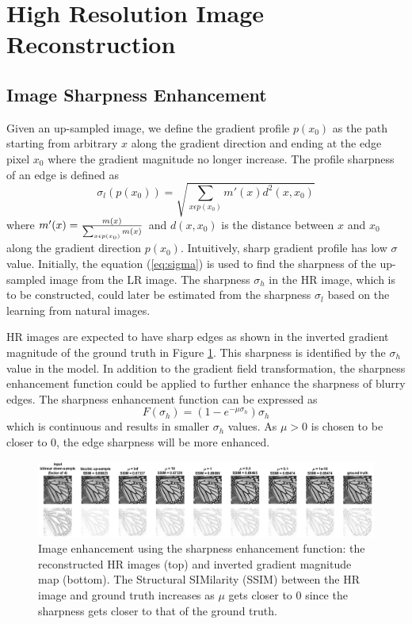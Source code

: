 \documentclass[a4paper,11pt]{article}
\begin{document}
\section{High Resolution Image Reconstruction}

\subsection{Image Sharpness Enhancement}

Given an up-sampled image, we define the gradient profile $p(x_0)$ as the path starting from arbitrary $x$ along the gradient direction and ending at the edge pixel $x_0$ where the gradient magnitude no longer increase. The profile sharpness of an edge is defined as
\begin{equation}
	\label{eq:sigma}
	\sigma_l(p(x_0)) = \sqrt{\sum_{x \epsilon p(x_0)} m'(x) d^2(x, x_0)}
\end{equation}
where $m'(x) = {m(x) \over \sum_{x \epsilon p(x_0)} m(x)}$ and $d(x,x_0)$ is the distance between $x$ and $x_0$ along the gradient direction $p(x_0)$. Intuitively, sharp gradient profile has low $\sigma$ value. Initially, the equation (\ref{eq:sigma}) is used to find the sharpness of the up-sampled image from the LR image. The sharpness $\sigma_h$ in the HR image, which is to be constructed, could later be estimated from the sharpness $\sigma_l$ based on the learning from natural images\cite{sr11}.

HR images are expected to have sharp edges as shown in the inverted gradient magnitude of the ground truth in Figure \ref{fig:mu}. This sharpness is identified by the $\sigma_h$ value in the model. In addition to the gradient field transformation, the sharpness enhancement function could be applied to further enhance the sharpness of blurry edges. The sharpness enhancement function can be expressed as
\begin{equation}
	F(\sigma_h) = (1-e^{-\mu\sigma_h})\sigma_h
\end{equation}
which is continuous and results in smaller $\sigma_h$ values. As $\mu > 0$ is chosen to be closer to 0, the edge sharpness will be more enhanced.

\begin{figure}[H]
	\centering
	\includegraphics[width=1\textwidth]{mu.png}
	\caption{Image enhancement using the sharpness enhancement function: the reconstructed HR images (top) and inverted gradient magnitude map (bottom). The Structural SIMilarity (SSIM) \cite{ssim04} between the HR image and ground truth increases as $\mu$ gets closer to 0 since the sharpness gets closer to that of the ground truth.}
	\label{fig:mu}
\end{figure}
\end{document}
